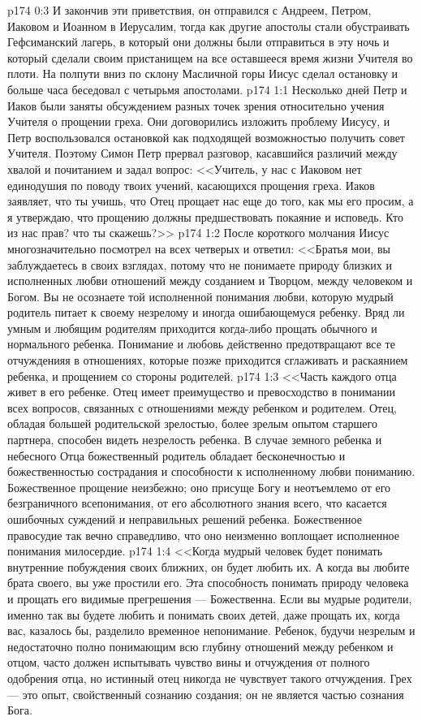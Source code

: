 \vs p174 0:3 И закончив эти приветствия, он отправился с Андреем, Петром, Иаковом и Иоанном в Иерусалим, тогда как другие апостолы стали обустраивать Гефсиманский лагерь, в который они должны были отправиться в эту ночь и который сделали своим пристанищем на все оставшееся время жизни Учителя во плоти. На полпути вниз по склону Масличной горы Иисус сделал остановку и больше часа беседовал с четырьмя апостолами.
\vs p174 1:1 Несколько дней Петр и Иаков были заняты обсуждением разных точек зрения относительно учения Учителя о прощении греха. Они договорились изложить проблему Иисусу, и Петр воспользовался остановкой как подходящей возможностью получить совет Учителя. Поэтому Симон Петр прервал разговор, касавшийся различий между хвалой и почитанием и задал вопрос: <<Учитель, у нас с Иаковом нет единодушия по поводу твоих учений, касающихся прощения греха. Иаков заявляет, что ты учишь, что Отец прощает нас еще до того, как мы его просим, а я утверждаю, что прощению должны предшествовать покаяние и исповедь. Кто из нас прав? что ты скажешь?>>
\vs p174 1:2 После короткого молчания Иисус многозначительно посмотрел на всех четверых и ответил: <<Братья мои, вы заблуждаетесь в своих взглядах, потому что не понимаете природу близких и исполненных любви отношений между созданием и Творцом, между человеком и Богом. Вы не осознаете той исполненной понимания любви, которую мудрый родитель питает к своему незрелому и иногда ошибающемуся ребенку. Вряд ли умным и любящим родителям приходится когда\hyp{}либо прощать обычного и нормального ребенка. Понимание и любовь действенно предотвращают все те отчужденияя в отношениях, которые позже приходится сглаживать и раскаянием ребенка, и прощением со стороны родителей.
\vs p174 1:3 <<Часть каждого отца живет в его ребенке. Отец имеет преимущество и превосходство в понимании всех вопросов, связанных с отношениями между ребенком и родителем. Отец, обладая большей родительской зрелостью, более зрелым опытом старшего партнера, способен видеть незрелость ребенка. В случае земного ребенка и небесного Отца божественный родитель обладает бесконечностью и божественностью сострадания и способности к исполненному любви пониманию. Божественное прощение неизбежно; оно присуще Богу и неотъемлемо от его безграничного всепонимания, от его абсолютного знания всего, что касается ошибочных суждений и неправильных решений ребенка. Божественное правосудие так вечно справедливо, что оно неизменно воплощает исполненное понимания милосердие.
\vs p174 1:4 <<Когда мудрый человек будет понимать внутренние побуждения своих ближних, он будет любить их. А когда вы любите брата своего, вы уже простили его. Эта способность понимать природу человека и прощать его видимые прегрешения --- Божественна. Если вы мудрые родители, именно так вы будете любить и понимать своих детей, даже прощать их, когда вас, казалось бы, разделило временное непонимание. Ребенок, будучи незрелым и недостаточно полно понимающим всю глубину отношений между ребенком и отцом, часто должен испытывать чувство вины и отчуждения от полного одобрения отца, но истинный отец никогда не чувствует такого отчуждения. Грех --- это опыт, свойственный сознанию создания; он не является частью сознания Бога.
